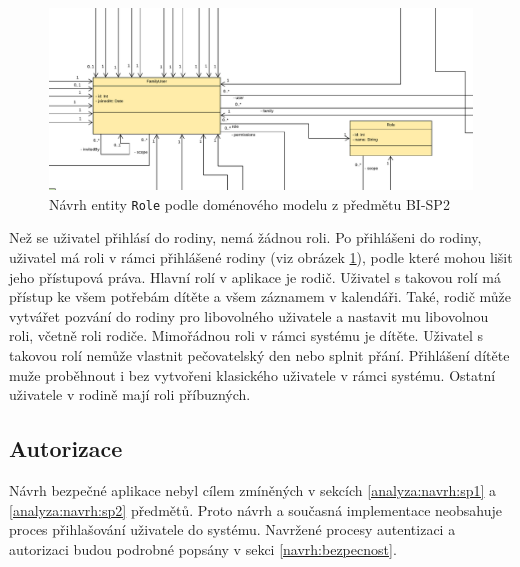         \begin{figure}\centering
	        \includegraphics[width=1.0\textwidth]{pdfs/Role1}
	        \caption[Návrh \texttt{Role}]{Návrh entity \texttt{Role} podle doménového modelu z předmětu BI-SP2}\label{image:Role1}
        \end{figure}
        Než se uživatel přihlásí do rodiny, nemá žádnou roli. Po přihlášeni do rodiny, uživatel má roli v rámci přihlášené rodiny (viz obrázek \ref{image:Role1}), podle které mohou lišit jeho přístupová práva. Hlavní rolí v aplikace je rodič. Uživatel s takovou rolí má přístup ke všem potřebám dítěte a všem záznamem v kalendáři. Také, rodič může vytvářet pozvání do rodiny pro libovolného uživatele a nastavit mu libovolnou roli, včetně roli rodiče. Mimořádnou roli v rámci systému je dítěte. Uživatel s takovou rolí nemůže vlastnit pečovatelský den nebo splnit přání. Přihlášení dítěte muže proběhnout i bez vytvořeni klasického uživatele v rámci systému. Ostatní uživatele v rodině mají roli příbuzných. 
    
    \subsection{Autorizace}
        Návrh bezpečné aplikace nebyl cílem zmíněných v sekcích \ref{analyza:navrh:sp1} a \ref{analyza:navrh:sp2} předmětů. Proto návrh a současná implementace neobsahuje proces přihlašování uživatele do systému. Navržené procesy autentizaci a autorizaci budou podrobné popsány v sekci \ref{navrh:bezpecnost}.
        
